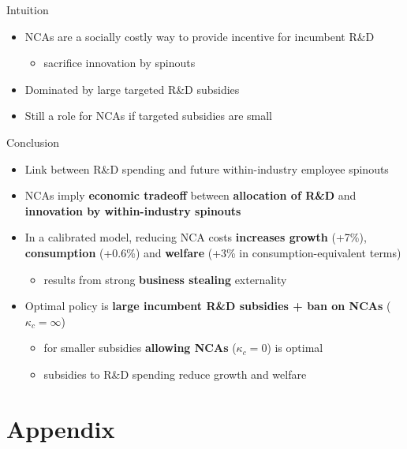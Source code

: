 \documentclass[english,usenames,dvipsnames]{beamer}
\begin{document}
\begin{frame}{Intuition}
	\begin{itemize}
		\item <+-> NCAs are a socially costly way to provide incentive for incumbent R\&D
		\begin{itemize}
			\item sacrifice innovation by spinouts
		\end{itemize}
		\smallskip
		\item <+-> Dominated by large targeted R\&D subsidies
		\smallskip
		\item <+-> Still a role for NCAs if targeted subsidies are small
	\end{itemize}
\end{frame}

\begin{frame}{Conclusion}
	\begin{itemize}
		\item Link between R\&D spending and future within-industry employee spinouts
		\medskip
		\item NCAs imply \alert{\textbf{economic tradeoff}} between \alert{\textbf{allocation of R\&D}} and \alert{\textbf{innovation by within-industry spinouts}}
		\medskip
		\item In a calibrated model, reducing NCA costs \alert{\textbf{increases growth }} (+7\%), \alert{\textbf{consumption}} (+0.6\%) and \alert{\textbf{welfare}} (+3\% in consumption-equivalent terms)
		\begin{itemize}
			\item results from strong \alert{\textbf{business stealing}} externality
		\end{itemize}
		\medskip
		\item Optimal policy is \alert{\textbf{large incumbent R\&D subsidies + ban on NCAs}} ($\kappa_c = \infty$)
		\begin{itemize}
			\item for smaller subsidies \alert{\textbf{allowing NCAs}} ($\kappa_c = 0$) is optimal
			\item subsidies to R\&D spending reduce growth and welfare
		\end{itemize}
	\end{itemize}
\end{frame}

\appendix

\section{Appendix}
\end{document}
